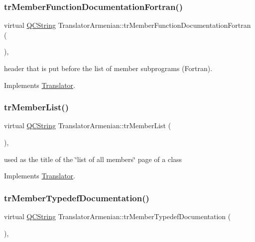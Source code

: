\subsubsection{\texorpdfstring{trMemberFunctionDocumentationFortran()}{trMemberFunctionDocumentationFortran()}}
{\footnotesize\ttfamily virtual \mbox{\hyperlink{class_q_c_string}{Q\+C\+String}} Translator\+Armenian\+::tr\+Member\+Function\+Documentation\+Fortran (\begin{DoxyParamCaption}{ }\end{DoxyParamCaption})\hspace{0.3cm}{\ttfamily [inline]}, {\ttfamily [virtual]}}

header that is put before the list of member subprograms (Fortran). 

Implements \mbox{\hyperlink{class_translator}{Translator}}.

\mbox{\label{class_translator_armenian_a88cc5a50e83067ffd290095b4844f19a}} 
\subsubsection{\texorpdfstring{trMemberList()}{trMemberList()}}
{\footnotesize\ttfamily virtual \mbox{\hyperlink{class_q_c_string}{Q\+C\+String}} Translator\+Armenian\+::tr\+Member\+List (\begin{DoxyParamCaption}{ }\end{DoxyParamCaption})\hspace{0.3cm}{\ttfamily [inline]}, {\ttfamily [virtual]}}

used as the title of the \char`\"{}list of all members\char`\"{} page of a class 

Implements \mbox{\hyperlink{class_translator}{Translator}}.

\mbox{\label{class_translator_armenian_a9e18dcdb36a07530885d6cd82e663c0f}} 
\subsubsection{\texorpdfstring{trMemberTypedefDocumentation()}{trMemberTypedefDocumentation()}}
{\footnotesize\ttfamily virtual \mbox{\hyperlink{class_q_c_string}{Q\+C\+String}} Translator\+Armenian\+::tr\+Member\+Typedef\+Documentation (\begin{DoxyParamCaption}{ }\end{DoxyParamCaption})\hspace{0.3cm}{\ttfamily [inline]}, {\ttfamily [virtual]}}

